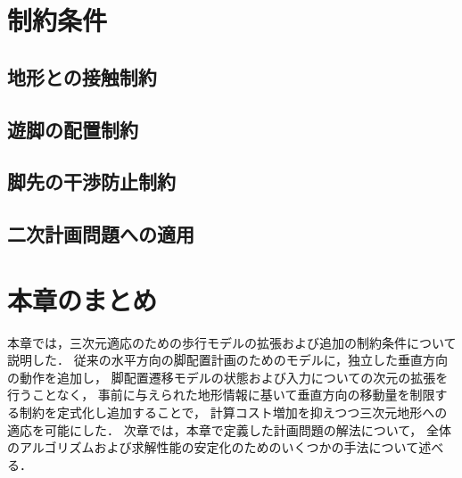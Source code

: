 \documentclass[autodetect-engine,dvipdfmx-if-dvi,ja=standard,a4j,jbase=11pt,magstyle=nomag*]{bxjsreport}
\begin{document}
\section{制約条件}


\subsection{地形との接触制約}




\subsection{遊脚の配置制約}


\subsection{脚先の干渉防止制約}


\subsection{二次計画問題への適用}


\section{本章のまとめ}
本章では，三次元適応のための歩行モデルの拡張および追加の制約条件について説明した．
従来の水平方向の脚配置計画のためのモデルに，独立した垂直方向の動作を追加し，
脚配置遷移モデルの状態および入力についての次元の拡張を行うことなく，
事前に与えられた地形情報に基いて垂直方向の移動量を制限する制約を定式化し追加することで，
計算コスト増加を抑えつつ三次元地形への適応を可能にした．
次章では，本章で定義した計画問題の解法について，
全体のアルゴリズムおよび求解性能の安定化のためのいくつかの手法について述べる．
\end{document}
